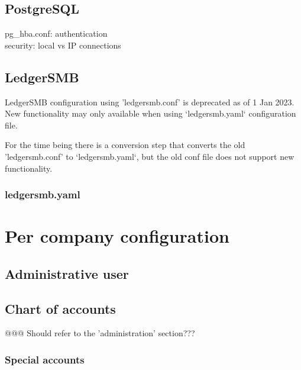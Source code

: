 \section{PostgreSQL}
\label{sec-global-config-postgresql}

pg\_hba.conf: authentication \\
security: local vs IP connections \\




\section{LedgerSMB}
\label{sec-global-config-ledgersmb}

LedgerSMB configuration using 'ledgersmb.conf' is deprecated as of 1 Jan 2023. New functionality may only available when using `ledgersmb.yaml` configuration file.

For the time being there is a conversion step that converts the old 'ledgersmb.conf' to `ledgersmb.yaml`, but the old conf file does not support new functionality.

\subsection{ledgersmb.yaml}
\label{subsec-global-config-ledgersmb-yaml}



\chapter{Per company configuration}
\label{cha-company-config}

\section{Administrative user}
\label{sec-company-config-admin-user}

\section{Chart of accounts}
\label{sec-company-config-coa}

@@@ Should refer to the 'administration' section???

\subsection{Special accounts}
\label{subsec-company-config-coa-special-accounts}

